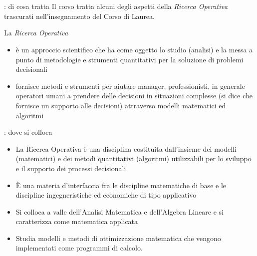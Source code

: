 \documentclass{beamer}
\begin{document}
\generatitolo

\section{\insegnamento}

\begin{frame}{\insegnamento: di cosa tratta}
  Il corso tratta alcuni degli aspetti della
  \emph{Ricerca Operativa} trascurati nell'insegnamento
  del Corso di Laurea.

  La \emph{Ricerca Operativa}
  \begin{itemize}
    \item \`e un approccio scientifico che ha come oggetto lo studio (analisi)
     e la messa a punto di metodologie e strumenti quantitativi per la soluzione
     di problemi decisionali
    \item fornisce metodi e strumenti per aiutare manager, professionisti,
    in generale operatori umani a prendere delle decisioni in situazioni complesse
    (si dice che fornisce un supporto alle decisioni) attraverso modelli matematici ed algoritmi
  \end{itemize} 
\end{frame}

\begin{frame}{\insegnamento: dove si colloca}
  \begin{itemize}
    \item La Ricerca Operativa \`e una disciplina costituita dall'insieme dei modelli (matematici)
    e dei metodi quantitativi (algoritmi) utilizzabili per lo sviluppo e il supporto dei processi decisionali

    \item \`E una materia d'interfaccia fra le discipline matematiche di base e le discipline
    ingegneristiche ed economiche di tipo applicativo

    \item Si colloca a valle dell'Analisi Matematica e dell'Algebra Lineare e si caratterizza come
    matematica applicata

	\item Studia modelli e metodi di ottimizzazione matematica che vengono implementati
	come programmi di calcolo.
  \end{itemize}
\end{frame}
\end{document}
